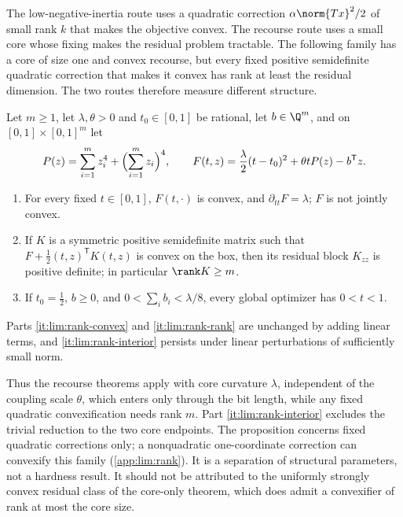 The low-negative-inertia route uses a quadratic correction
$\alpha\norm{Tx}^2/2$ of small rank $k$ that makes the objective convex. The
recourse route uses a small core whose fixing makes the residual problem
tractable. The following family has a core of size one and convex
recourse, but every fixed positive semidefinite quadratic correction that
makes it convex has rank at least the residual dimension. The two routes
therefore measure different structure.

\begin{proposition}\label{prop:lim:rank}
Let $m\ge1$, let $\lambda,\theta>0$ and $t_0\in[0,1]$ be rational, let
$b\in\Q^m$, and on $[0,1]\times[0,1]^m$ let
\[
 P(z)=\sum_{i=1}^mz_i^4+\Bigl(\sum_{i=1}^mz_i\Bigr)^4,\qquad
 F(t,z)=\frac\lambda2(t-t_0)^2+\theta tP(z)-b^{\mathsf T}z .
\]
\begin{enumerate}[label=(\alph*)]
\item\label{it:lim:rank-convex} For every fixed $t\in[0,1]$, $F(t,\cdot)$ is
convex, and $\partial_{tt}F=\lambda$; $F$ is not jointly convex.
\item\label{it:lim:rank-rank} If $K$ is a symmetric positive semidefinite
matrix such that $F+\frac12(t,z)^{\mathsf T}K(t,z)$ is convex on the box,
then its residual block $K_{zz}$ is positive definite; in particular
$\rank K\ge m$.
\item\label{it:lim:rank-interior} If $t_0=\frac12$, $b\ge0$, and
$0<\sum_ib_i<\lambda/8$, every global optimizer has $0<t<1$.
\end{enumerate}
Parts \ref{it:lim:rank-convex} and \ref{it:lim:rank-rank} are unchanged by
adding linear terms, and \ref{it:lim:rank-interior} persists under linear
perturbations of sufficiently small norm.
\end{proposition}

Thus the recourse theorems apply with core curvature $\lambda$, independent
of the coupling scale $\theta$, which enters only through the bit length,
while any fixed quadratic convexification needs rank $m$. Part
\ref{it:lim:rank-interior} excludes the trivial reduction to the two core
endpoints. The proposition concerns fixed quadratic corrections only; a
nonquadratic one-coordinate correction can convexify this family
(\cref{app:lim:rank}). It is a separation of structural parameters, not a
hardness result. It should not be attributed to the uniformly strongly
convex residual class of the core-only theorem, which does admit a
convexifier of rank at most the core size.
